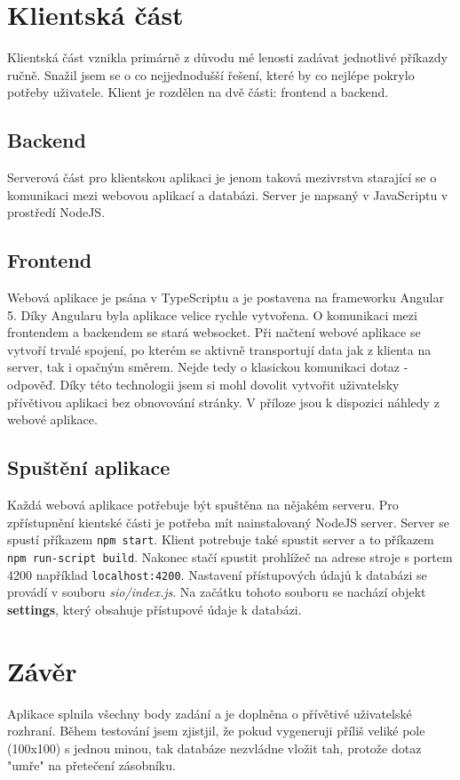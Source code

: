 \documentclass{article}
\begin{document}
\begin{minipage}{\linewidth}

\end{minipage}

\section{Klientská část}
Klientská část vznikla primárně z důvodu mé lenosti zadávat jednotlivé
příkazdy ručně. Snažil jsem se o co nejjednodušší řešení, které by 
co nejlépe pokrylo potřeby uživatele. 
Klient je rozdělen na dvě části: frontend a backend.
\subsection{Backend}
Serverová část pro klientskou aplikaci je jenom taková mezivrstva starající se o komunikaci
mezi webovou aplikací a databázi. Server je napsaný v JavaScriptu v prostředí NodeJS.
\subsection{Frontend}
Webová aplikace je psána v TypeScriptu a je postavena na frameworku Angular 5.
Díky Angularu byla aplikace velice rychle vytvořena.
O komunikaci mezi frontendem a backendem se stará websocket.
Při načtení webové aplikace se vytvoří trvalé spojení, po kterém se aktivně transportují
data jak z klienta na server, tak i opačným směrem. Nejde tedy o klasickou komunikaci
dotaz - odpověď. Díky této technologii jsem si mohl dovolit vytvořit uživatelsky přívětivou
aplikaci bez obnovování stránky.
V příloze jsou k dispozici náhledy z webové aplikace.
\subsection{Spuštění aplikace}
Každá webová aplikace potřebuje být spuštěna na nějakém serveru.
Pro zpřístupnění kientské části je potřeba mít nainstalovaný NodeJS server.
Server se spustí příkazem \lstinline{npm start}.
Klient potrebuje také spustit server a to příkazem \lstinline{npm run-script build}.
Nakonec stačí spustit prohlížeč na adrese stroje s portem 4200 například 
\lstinline{localhost:4200}.
Nastavení přístupových údajů k databázi se provádí v souboru \textit{sio/index.js}.
Na začátku tohoto souboru se nachází objekt \textbf{settings}, který obsahuje přístupové
údaje k databázi.


\section{Závěr}
Aplikace splnila všechny body zadání a je doplněna o přívětivé uživatelské rozhraní.
Během testování jsem zjistjil, že pokud vygeneruji příliš veliké pole (100x100) s jednou
minou, tak databáze nezvládne vložit tah, protože dotaz "umře" na přetečení zásobníku.
\end{document}
